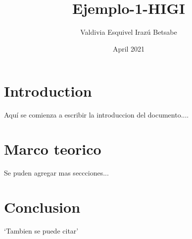 \documentclass{article}
\title{Ejemplo-1-HIGI}
\author{Valdivia Esquivel Irazú Betsabe }
\date{April 2021}
\begin{document}
\maketitle

\section{Introduction}
Aquí se comienza a escribir la introduccion del documento....


\section{Marco teorico}
Se puden agregar mas seccciones...

\section{Conclusion}
`Tambien se puede citar'  \citep{adams1995hitchhiker}



\end{document}
